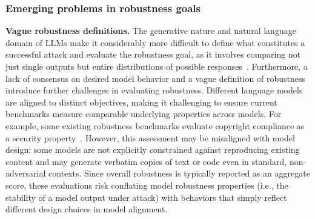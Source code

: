 \subsubsection{Emerging problems in robustness goals}\label{sec:goal-amplified}



\textbf{Vague robustness definitions.} The generative nature and natural language domain of LLMs make it considerably more difficult to define what constitutes a successful attack and evaluate the robustness goal, as it involves comparing not just single outputs but entire distributions of possible responses~\cite{scholten2025a}. Furthermore, a lack of consensus on desired model behavior and a vague definition of robustness introduce further challenges in evaluating robustness. Different language models are aligned to distinct objectives, making it challenging to ensure current benchmarks measure comparable underlying properties across models. For example, some existing robustness benchmarks evaluate copyright compliance as a security property~\cite{mazeika2024harmbench}. However, this assessment may be misaligned with model design: some models are not explicitly constrained against reproducing existing content and may generate verbatim copies of text or code even in standard, non-adversarial contexts. Since overall robustness is typically reported as an aggregate score, these evaluations risk conflating model robustness properties (i.e., the stability of a model output under attack) with behaviors that simply reflect different design choices in model alignment. %

